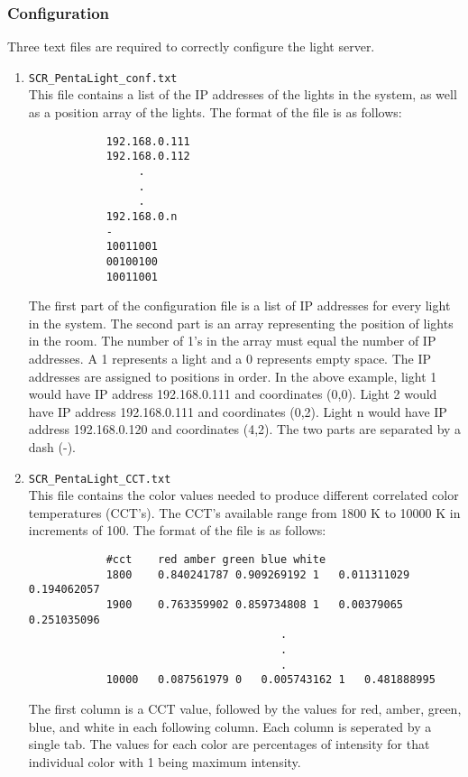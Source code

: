 \documentclass[twoside]{article}
\begin{document}
	\subsubsection{Configuration}
	Three text files are required to correctly configure the light server.
	\begin{enumerate}
		\item \verb|SCR_PentaLight_conf.txt|\\
		This file contains a list of the IP addresses of the lights in the system, as well as a position array of the lights. The format of the file is as follows:
		\begin{verbatim}
		    192.168.0.111
		    192.168.0.112
		         .
		         .
		         .
		    192.168.0.n
		    -
		    10011001
		    00100100
		    10011001
		\end{verbatim}
		The first part of the configuration file is a list of IP addresses for every light in the system. The second part is an array representing the position of lights in the room. The number of 1's in the array must equal the number of IP addresses. A 1 represents a light and a 0 represents empty space. The IP addresses are assigned to positions in order. In the above example, light 1 would have IP address 192.168.0.111 and coordinates (0,0). Light 2 would have IP address 192.168.0.111 and coordinates (0,2). Light n would have IP address 192.168.0.120 and coordinates (4,2). The two parts are separated by a dash (-). 
		
		\item \verb|SCR_PentaLight_CCT.txt|\\
		This file contains the color values needed to produce different correlated color temperatures (CCT's). The CCT's available range from 1800 K to 10000 K in increments of 100. The format of the file is as follows:
		\begin{verbatim}
		    #cct    red amber green blue white
		    1800	0.840241787	0.909269192	1	0.011311029	0.194062057
		    1900	0.763359902	0.859734808	1	0.00379065	0.251035096
			                           .
			                           .
			                           .
		    10000	0.087561979	0	0.005743162	1	0.481888995
		\end{verbatim}
		The first column is a CCT value, followed by the values for red, amber, green, blue, and white in each following column. Each column is seperated by a single tab. The values for each color are percentages of intensity for that individual color with 1 being maximum intensity.
		

\end{enumerate}
\end{document}
